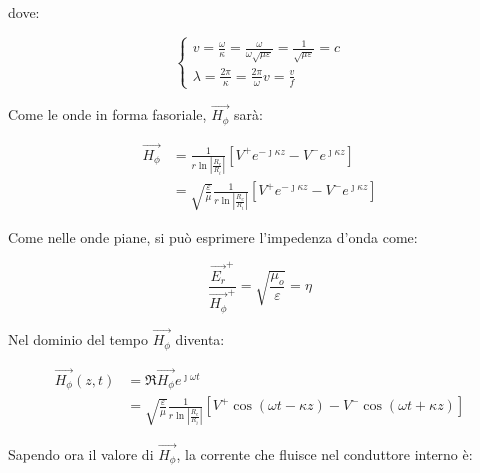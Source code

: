 dove: 

{\Large \begin{equation}
    \begin{cases}
        v = \frac{\omega}{\kappa} 
        = \frac{\omega}{ \omega \sqrt{\mu \varepsilon}} 
        = \frac{1}{\sqrt{\mu \varepsilon}} 
        = c \\ 
        \lambda = \frac{2 \pi}{\kappa} 
        = \frac{2 \pi}{\omega} v 
        = \frac{v}{f}
    \end{cases}
\end{equation}}

Come le onde in forma fasoriale, $\vec{H_\phi}$ sarà: 

{\Large \begin{equation}
    \begin{split}
        \vec{H_\phi} &= \frac{1}{r \ln \left|\frac{R_e}{R_i}\right|} [V^{+} e^{-\jmath \kappa z} - V^{-} e^{\jmath \kappa z}] \\ 
        &= \sqrt{\frac{\varepsilon}{\mu}} \frac{1}{r \ln \left|\frac{R_e}{R_i}\right|} [V^{+} e^{-\jmath \kappa z} - V^{-} e^{\jmath \kappa z}]
    \end{split}
\end{equation}}

Come nelle onde piane, si può esprimere l'impedenza d'onda come: 

{\Large \begin{equation}
    \frac{\vec{E_r}^{+}}{\vec{H_\phi}^{+}} = 
    \sqrt{\frac{\mu_o}{\varepsilon}} = 
    \eta
\end{equation}}

Nel dominio del tempo $\vec{H_\phi}$ diventa: 

{\Large \begin{equation}
    \begin{split}
        \vec{H_\phi} (z, t) 
        &= \Re{\vec{H_\phi} e^{\jmath \omega t}} \\ 
        &= \sqrt{\frac{\varepsilon}{\mu}} \frac{1}{r \ln \left|\frac{R_e}{R_i}\right|} [V^{+} \cos(\omega t - \kappa z) - V^{-} \cos(\omega t + \kappa z)]
    \end{split}
\end{equation}} 

Sapendo ora il valore di $\vec{H_\phi}$,  
la corrente che fluisce nel conduttore interno è: 

